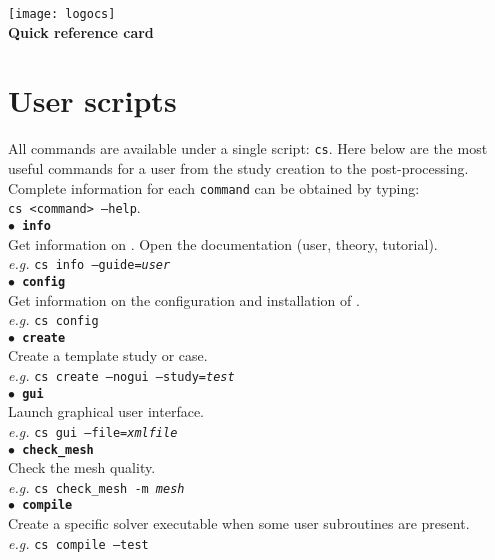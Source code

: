 \documentclass[a4paper,11pt]{article}
\newcommand{\refword}[1]{\texttt{$\bullet$ \bf{#1}}}
\begin{document}
\begin{multicols*}{3}

\begin{center}
  \texttt{[image: logocs]}
  {\Large {\bf \CS~\verscs\\Quick reference card}}
\end{center}


\section*{User scripts}

All \CS commands are available under a single script: \texttt{cs}.
Here below are the most useful commands for a \CS user from the study
creation to the post-processing. Complete information for each
\texttt{command} can be obtained by typing:\\
\texttt{cs <command> --help}.\\

\refword{info}\\
Get information on \CS. Open the documentation (user, theory,
tutorial).\\
\textit{e.g.} \texttt{cs info --guide=\emph{user}}\\

\refword{config}\\
Get information on the configuration and installation of \CS.\\
\textit{e.g.} \texttt{cs config}\\

\refword{create}\\
Create a \CS template study or case.\\
\textit{e.g.} \texttt{cs create --nogui --study=\emph{test}}\\

\refword{gui}\\
Launch \CS graphical user interface.\\
\textit{e.g.} \texttt{cs gui --file=\emph{xmlfile}}\\

\refword{check\_mesh}\\
Check the mesh quality.\\
\textit{e.g.} \texttt{cs check\_mesh -m \emph{mesh}}\\

\refword{compile}\\
Create a specific solver executable when some user subroutines are
present.\\
\textit{e.g.} \texttt{cs compile --test}\\


\end{multicols*}
\end{document}
